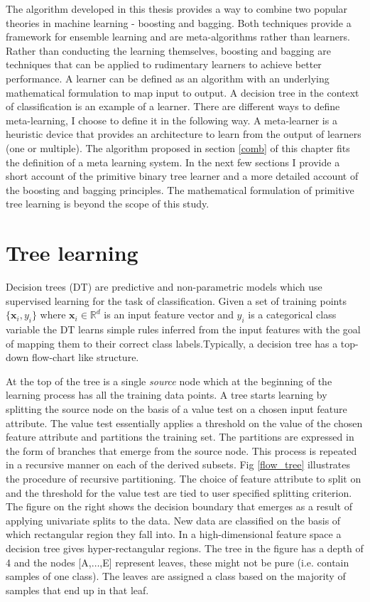 
The algorithm developed in this thesis provides a way to combine two popular theories in machine learning - boosting and bagging. Both techniques provide a framework for ensemble learning and are meta-algorithms rather than learners. Rather than conducting the learning themselves, boosting and bagging are techniques that can be applied to rudimentary learners to achieve better performance. A learner can be defined as an algorithm with an underlying mathematical formulation to map input to output. A decision tree in the context of classification is an example of a learner. There are different ways to define meta-learning, I choose to define it in the following way. A meta-learner is a heuristic device that provides an architecture to learn from the output of learners (one or multiple). The algorithm proposed in section \ref{comb} of this chapter fits the definition of a meta learning system. In the next few sections I provide a short account of the primitive binary tree learner and a more detailed account of the boosting and bagging principles. The mathematical formulation of primitive tree learning is beyond the scope of this study.


\section{Tree learning}
\label{DT}

Decision trees (DT) are predictive and non-parametric models which use supervised learning for the task of classification. Given a set of training points $\{\textbf{x}_{i},y_{i}\}$ where $\textbf{x}_{i} \in \mathbb{R}^d$ is an input feature vector and $y_{i}$ is a categorical class variable the DT learns simple rules inferred from the input features with the goal of mapping them to their correct class labels.Typically, a decision tree has a top-down flow-chart like structure. 

At the top of the tree is a single \textit{source} node which at the beginning of the learning process has all the training data points. A tree starts learning by splitting the source node on the basis of a value test on a chosen input feature attribute. The value test essentially applies a threshold on the value of the chosen feature attribute and   partitions the training set. The partitions are expressed in the form of branches that emerge from the source node. This process is repeated in a recursive manner on each of the derived subsets. Fig \ref{flow_tree} illustrates the procedure of recursive partitioning. The choice of feature attribute to split on and the threshold for the value test are tied to user specified splitting criterion. The figure on the right shows the decision boundary that emerges as a result of applying univariate splits to the data. New data are classified on the basis of which rectangular region they fall into. In a high-dimensional feature space a decision tree gives hyper-rectangular regions. The tree in the figure has a depth of 4 and the nodes [A,$\ldots$,E] represent leaves, these might not be pure (i.e. contain samples of one class). The leaves are assigned a class based on the majority of samples that end up in that leaf.
 
